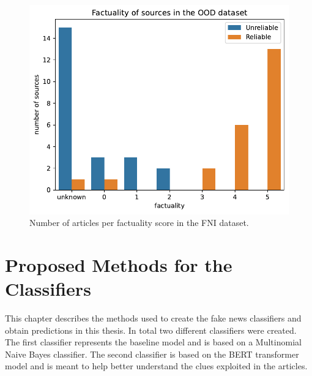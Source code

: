 
\begin{figure}[]
    \centering
    \includegraphics[scale=0.6]{obrazky-figures/test_dataset_factuality.pdf}
    \caption{Number of articles per factuality score in the FNI dataset.}
    \label{fig:test_dataset_fact}
\end{figure}


\chapter{Proposed Methods for the Classifiers}
\label{proposed-methods}
This chapter describes the methods used to create the fake news classifiers and obtain predictions in this thesis. In total two different classifiers were created. The first classifier represents the baseline model and is based on a Multinomial Naive Bayes classifier. The second classifier is based on the BERT transformer model and is meant to help better understand the clues exploited in the articles.


